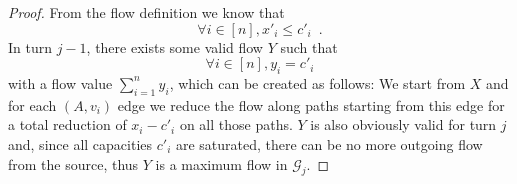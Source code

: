 \begin{proof}
   From the flow definition we know that
   \begin{equation}
   \label{saturation:flowleqcap}
      \forall i \in [n], x'_i \leq c'_i \enspace.
   \end{equation}
   In turn $j-1$, there exists some valid flow $Y$ such that
   \begin{equation*}
      \forall i \in [n], y_i = c'_i
   \end{equation*}
   with a flow value $\sum\limits_{i=1}^{n}y_i$, which can be created as follows: We start from $X$ and for each
   $\left(A, v_i\right)$ edge we reduce the flow along paths starting from this edge for a total reduction of $x_i - c'_i$ on
   all those paths. $Y$ is also obviously valid for turn $j$ and, since all capacities $c'_i$ are saturated, there can
   be no more outgoing flow from the source, thus $Y$ is a maximum flow in $\mathcal{G}_j$.
\end{proof}
